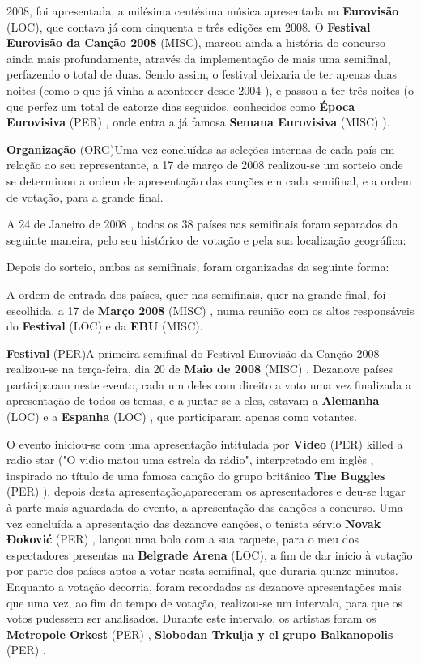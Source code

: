 \documentclass[12pt,a4paper]{article}
\begin{document}
2008, foi apresentada, a milésima centésima música apresentada na \textbf{Eurovisão} (LOC), que contava já com cinquenta e três edições em 2008. O \textbf{Festival Eurovisão da Canção 2008} (MISC), marcou ainda a história do concurso ainda mais profundamente, através da implementação de mais uma semifinal, perfazendo o total de duas. Sendo assim, o festival deixaria de ter apenas duas noites (como o que já vinha a acontecer desde 2004 ), e passou a ter três noites (o que perfez um total de catorze dias seguidos, conhecidos como \textbf{Época Eurovisiva} (PER) , onde entra a já famosa \textbf{Semana Eurovisiva} (MISC) ).



\textbf{Organização} (ORG)Uma vez concluídas as seleções internas de cada país em relação ao seu representante, a 17 de março de 2008 realizou-se um sorteio onde se determinou a ordem de apresentação das canções em cada semifinal, e a ordem de votação, para a grande final.

A 24 de Janeiro de 2008 , todos os 38 países nas semifinais foram separados da seguinte maneira, pelo seu histórico de votação e pela sua localização geográfica:

Depois do sorteio, ambas as semifinais, foram organizadas da seguinte forma:

A ordem de entrada dos países, quer nas semifinais, quer na grande final, foi escolhida, a 17 de \textbf{Março 2008} (MISC) , numa reunião com os altos responsáveis do \textbf{Festival} (LOC) e da \textbf{EBU} (MISC).



\textbf{Festival} (PER)A primeira semifinal do Festival Eurovisão da Canção 2008 realizou-se na terça-feira, dia 20 de \textbf{Maio de 2008} (MISC) . Dezanove países participaram neste evento, cada um deles com direito a voto uma vez finalizada a apresentação de todos os temas, e a juntar-se a eles, estavam a \textbf{Alemanha} (LOC) e a \textbf{Espanha} (LOC) , que participaram apenas como votantes.

O evento iniciou-se com uma apresentação intitulada por \textbf{Video} (PER) killed a radio star ("O vidio matou uma estrela da rádio", interpretado em inglês , inspirado no título de uma famosa canção do grupo britânico \textbf{The Buggles} (PER) ), depois desta apresentação,apareceram os apresentadores e deu-se lugar à parte mais aguardada do evento, a apresentação das canções a concurso. Uma vez concluída a apresentação das dezanove canções, o tenista sérvio \textbf{Novak Đoković} (PER) , lançou uma bola com a sua raquete, para o meu dos espectadores presentas na \textbf{Belgrade Arena} (LOC), a fim de dar início à votação por parte dos países aptos a votar nesta semifinal, que duraria quinze minutos. Enquanto a votação decorria, foram recordadas as dezanove apresentações mais que uma vez, ao fim do tempo de votação, realizou-se um intervalo, para que os votos pudessem ser analisados. Durante este intervalo, os artistas foram os \textbf{Metropole Orkest} (PER) , \textbf{Slobodan Trkulja y el grupo Balkanopolis} (PER) .
\end{document}
